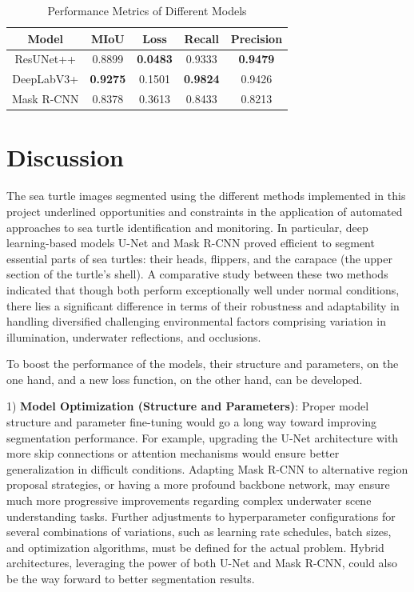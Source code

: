 \documentclass[conference]{IEEEtran}
\begin{document}
\begin{table}[h]
\centering
\renewcommand{\arraystretch}{1.2} %
\setlength{\tabcolsep}{6pt} %
\caption{Performance Metrics of Different Models}
\begin{tabular}{|c|c|c|c|c|}
\hline
\textbf{Model} & \textbf{MIoU} & \textbf{Loss} & \textbf{Recall} & \textbf{Precision} \\ \hline
ResUNet++ & 0.8899 & \textbf{0.0483} & 0.9333 & \textbf{0.9479} \\ \hline
DeepLabV3+ & \textbf{0.9275} & 0.1501 & \textbf{0.9824} & 0.9426 \\ \hline
Mask R-CNN & 0.8378 & 0.3613 & 0.8433 & 0.8213 \\ \hline
\end{tabular}
\end{table}
\section{Discussion}
The sea turtle images segmented using the different methods implemented in this project underlined opportunities and constraints in the application of automated approaches to sea turtle identification and monitoring. In particular, deep learning-based models U-Net and Mask R-CNN proved efficient to segment essential parts of sea turtles: their heads, flippers, and the carapace (the upper section of the turtle's shell). A comparative study between these two methods indicated that though both perform exceptionally well under normal conditions, there lies a significant difference in terms of their robustness and adaptability in handling diversified challenging environmental factors comprising variation in illumination, underwater reflections, and occlusions.

To boost the performance of the models, their structure and parameters, on the one hand, and a new loss function, on the other hand, can be developed.

1) \textbf{Model Optimization (Structure and Parameters)}: Proper model structure and parameter fine-tuning would go a long way toward improving segmentation performance. For example, upgrading the U-Net architecture with more skip connections or attention mechanisms would ensure better generalization in difficult conditions. Adapting Mask R-CNN to alternative region proposal strategies, or having a more profound backbone network, may ensure much more progressive improvements regarding complex underwater scene understanding tasks. Further adjustments to hyperparameter configurations for several combinations of variations, such as learning rate schedules, batch sizes, and optimization algorithms, must be defined for the actual problem. Hybrid architectures, leveraging the power of both U-Net and Mask R-CNN, could also be the way forward to better segmentation results.
\end{document}
